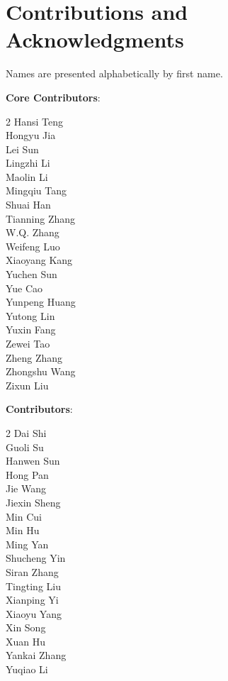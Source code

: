 \newpage
\section*{Contributions and Acknowledgments}

Names are presented alphabetically by first name.

\vspace{1em}

\noindent\textbf{Core Contributors}:
\vspace{-1em}
\begin{multicols}{2}
\noindent
Hansi Teng	\\
Hongyu Jia	\\
Lei Sun	\\
Lingzhi Li	\\
Maolin Li	\\
Mingqiu Tang	\\
Shuai Han	\\
Tianning Zhang	\\
W.Q. Zhang	\\
Weifeng Luo	\\
Xiaoyang Kang	\\
Yuchen Sun	\\
Yue Cao	\\
Yunpeng Huang	\\
Yutong Lin	\\
Yuxin Fang	\\
Zewei Tao	\\
Zheng Zhang	\\
Zhongshu Wang	\\
Zixun Liu
\end{multicols}

\vspace{1em}
\noindent\textbf{Contributors}:
\vspace{-1em}
\begin{multicols}{2}
\noindent
Dai Shi \\
Guoli Su \\
Hanwen Sun \\
Hong Pan \\
Jie Wang \\
Jiexin Sheng \\
Min Cui \\
Min Hu \\
Ming Yan \\
Shucheng Yin \\
Siran Zhang \\
Tingting Liu \\
Xianping Yi \\
Xiaoyu Yang \\
Xin Song \\
Xuan Hu \\
Yankai Zhang \\
Yuqiao Li
\end{multicols}


